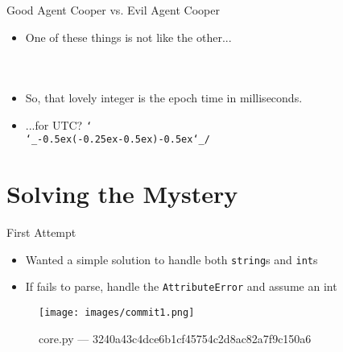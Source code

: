 \documentclass[10pt]{beamer}
\def\shrug{\texttt{\raisebox{0.75em}{\char`\_}\char`\\\char`\_\kern-0.5ex(\kern-0.25ex\raisebox{0.25ex}{\rotatebox{45}{\raisebox{-.75ex}"\kern-1.5ex\rotatebox{-90})}}\kern-0.5ex)\kern-0.5ex\char`\_/\raisebox{0.75em}{\char`\_}}}
\begin{document}
\begin{frame}{Good Agent Cooper vs. Evil Agent Cooper}
	\begin{itemize}
		\item One of these things is not like the other...
	\end{itemize}
	\begin{columns}
		\begin{column}{0.5 \textwidth}
			\inputminted[fontsize=\small,frame=single,framesep=2mm,linenos=false,breaklines]{javascript}{src/good.json}
		\end{column}
		\begin{column}{0.5 \textwidth}
			\inputminted[fontsize=\small,frame=single,framesep=2mm,linenos=true,breaklines]{javascript}{src/bad.json}
		\end{column}
	\end{columns}
	\begin{itemize}
		\item So, that lovely integer is the epoch time in milliseconds.
		\item ...for UTC? \shrug
	\end{itemize}
\end{frame}

\section{Solving the Mystery}
\begin{frame}{First Attempt}
	\begin{itemize}
		\item Wanted a simple solution to handle both \texttt{string}s and \texttt{int}s
		\item If fails to parse, handle the \texttt{AttributeError} and assume an int
	\end{itemize}
	\begin{figure}
		\centering
		\texttt{[image: images/commit1.png]}
		\caption{core.py --- 3240a43c4dce6b1cf45754c2d8ac82a7f9c150a6}
	\end{figure}
\end{frame}
\end{document}
